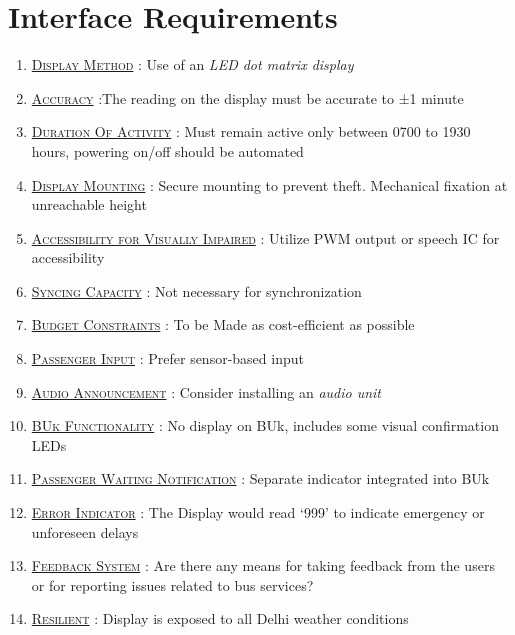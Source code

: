 \section{Interface Requirements}

\begin{enumerate}
    \item {}\underline{\textsc{Display Method}} : Use of an \textit{\gls{LED dot matrix display}}{\tiny \textcolor{white}{\ac{LED}}}

    \item \underline{\textsc{Accuracy}} :The reading on the display must be accurate to ±1 minute

    \item \underline{\textsc{Duration Of Activity}} : Must remain active only between 0700 to 1930 hours, powering on/off should be automated

    \item {}\underline{\textsc{Display Mounting}} : Secure mounting to prevent theft. Mechanical fixation at unreachable height

    \item \underline{\textsc{Accessibility for Visually Impaired}} :  Utilize \ac{PWM} output or speech IC for accessibility

    \item {}\underline{\textsc{Syncing Capacity}} : Not necessary for synchronization

    \item {}\underline{\textsc{Budget Constraints}} : To be Made as cost-efficient as possible

    \item {}\underline{\textsc{Passenger Input}} : Prefer sensor-based input

    \item \underline{\textsc{Audio Announcement}} : Consider installing an \textit{\gls{audio unit}}

    \item {}\underline{\textsc{\ac{BUk} Functionality}} : No display on \ac{BUk}, includes some visual confirmation LEDs

    \item \underline{\textsc{Passenger Waiting Notification}} : Separate indicator integrated into BUk

    \item {}\underline{\textsc{Error Indicator}} : The Display would read ‘999’ to indicate emergency or unforeseen delays

    \item \underline{\textsc{Feedback System}} : Are there any means for taking feedback from the users or for reporting issues related to bus services?

    \item \underline{\textsc{Resilient}} : Display is exposed to all Delhi weather conditions

\end{enumerate}